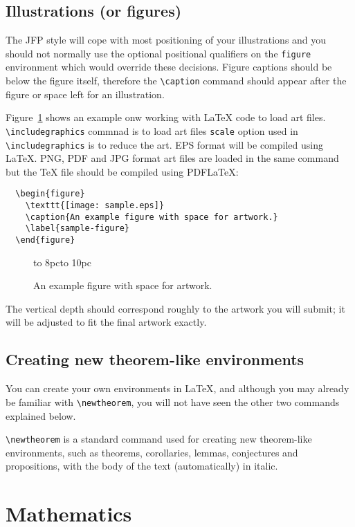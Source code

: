 \documentclass{jfp}
\begin{document}
\subsection{Illustrations (or figures)}

The JFP style will cope with most positioning of your illustrations
and you should not normally use the optional positional qualifiers on
the \verb"figure" environment which would override these decisions.
Figure captions should be below the figure itself, therefore the \verb"\caption"
command should appear after the figure or space left for an illustration.

Figure~\ref{sample-figure} shows an example onw working with LaTeX code to load art files. \verb"\includegraphics" commnad is to load art files \verb"scale" option used in \verb"\includegraphics" is to reduce the art. EPS format will be compiled using LaTeX. PNG, PDF and JPG format art files are loaded in the same command but the TeX file should be compiled using PDFLaTeX:
%
\begin{verbatim}
  \begin{figure}
    \texttt{[image: sample.eps]}
    \caption{An example figure with space for artwork.}
    \label{sample-figure}
  \end{figure}
\end{verbatim}
%
\begin{figure}[t]
  \centerline{\vbox to 8pc{\hbox to 10pc{}}}
  \caption{An example figure with space for artwork.}
  \label{sample-figure}
\end{figure}
%
The vertical depth should correspond roughly to the artwork you will submit;
it will be adjusted to fit the final artwork exactly.

\subsection{Creating new theorem-like environments}

You can create your own environments in LaTeX, and although you may already
be familiar with \verb"\newtheorem", you will not have seen the other two
commands explained below.

\verb"\newtheorem" is a standard command used for creating new
        theorem-like environments, such as theorems, corollaries, lemmas,
        conjectures and propositions, with the body of the text
        (automatically) in italic.

\section{Mathematics}
\end{document}

